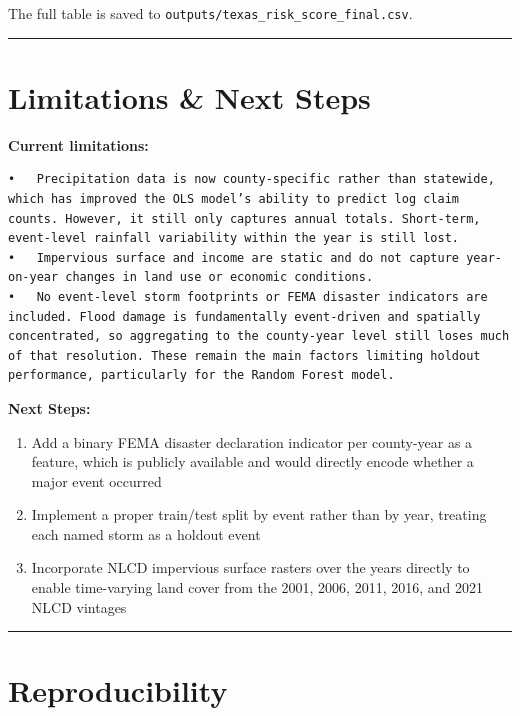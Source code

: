 \documentclass[
  letterpaper,
  DIV=11,
  numbers=noendperiod]{scrartcl}
\providecommand{\tightlist}{%
  \setlength{\itemsep}{0pt}\setlength{\parskip}{0pt}}
\begin{document}
The full table is saved to
\texttt{outputs/texas\_risk\_score\_final.csv}.

\begin{center}\rule{0.5\linewidth}{0.5pt}\end{center}

\section{Limitations \& Next Steps}\label{limitations-next-steps}

\textbf{Current limitations:}

\begin{verbatim}
•   Precipitation data is now county-specific rather than statewide, which has improved the OLS model’s ability to predict log claim counts. However, it still only captures annual totals. Short-term, event-level rainfall variability within the year is still lost.
•   Impervious surface and income are static and do not capture year-on-year changes in land use or economic conditions.
•   No event-level storm footprints or FEMA disaster indicators are included. Flood damage is fundamentally event-driven and spatially concentrated, so aggregating to the county-year level still loses much of that resolution. These remain the main factors limiting holdout performance, particularly for the Random Forest model.
\end{verbatim}

\textbf{Next Steps:}

\begin{enumerate}
\def\labelenumi{\arabic{enumi}.}
\tightlist
\item
  Add a binary FEMA disaster declaration indicator per county-year as a
  feature, which is publicly available and would directly encode whether
  a major event occurred
\item
  Implement a proper train/test split by event rather than by year,
  treating each named storm as a holdout event
\item
  Incorporate NLCD impervious surface rasters over the years directly to
  enable time-varying land cover from the 2001, 2006, 2011, 2016, and
  2021 NLCD vintages
\end{enumerate}

\begin{center}\rule{0.5\linewidth}{0.5pt}\end{center}

\section{Reproducibility}\label{reproducibility}
\end{document}
